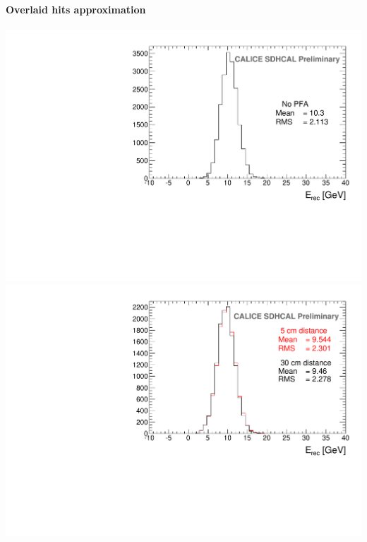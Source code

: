 \documentclass[8pt]{beamer}
\begin{document}
\begin{frame}
\begin{minipage}{0.44\linewidth}
\begin{center}
{        }
      \end{center}
    \end{minipage}
  \end{frame}
  
  
  \begin{frame}
  \frametitle{\secname}
  \framesubtitle{Overlaid hits approximation}
    \begin{center}
      \includegraphics[width=0.52\linewidth]{SingleParticle_10GeV.pdf}
      \includegraphics[width=0.52\linewidth]{OverlayEvent_OverlayCompare.pdf}
    \end{center}    
  \end{frame}
  
\end{document}
